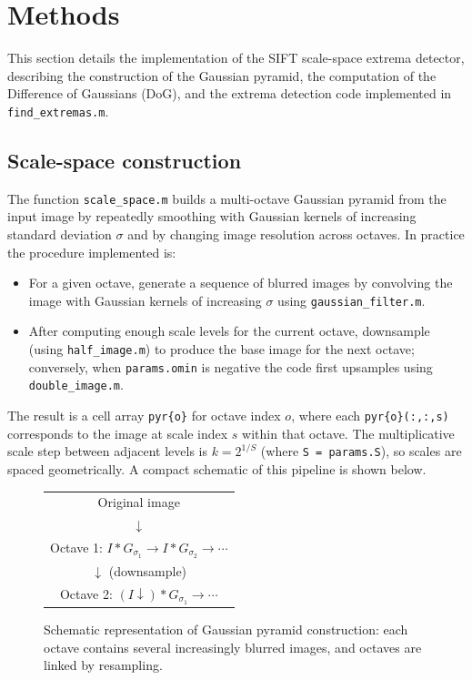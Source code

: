 \documentclass{article}
\begin{document}
\section{Methods}

This section details the implementation of the SIFT scale-space extrema detector, 
describing the construction of the Gaussian pyramid, the computation of the Difference 
of Gaussians (DoG), and the extrema detection code implemented in \texttt{find\_extremas.m}.

\subsection*{Scale-space construction}
The function \texttt{scale\_space.m} builds a multi-octave Gaussian pyramid from the input 
image by repeatedly smoothing with Gaussian kernels of increasing standard deviation $\sigma$ 
and by changing image resolution across octaves. In practice the procedure implemented is:

\begin{itemize}
    \item For a given octave, generate a sequence of blurred images by convolving the image 
    with Gaussian kernels of increasing $\sigma$ using \texttt{gaussian\_filter.m}.
    \item After computing enough scale levels for the current octave, downsample (using 
    \texttt{half\_image.m}) to produce the base image for the next octave; conversely, when 
    \texttt{params.omin} is negative the code first upsamples using \texttt{double\_image.m}.
\end{itemize}

The result is a cell array \texttt{pyr\{o\}} for octave index $o$, where each 
\texttt{pyr\{o\}(:,:,s)} corresponds to the image at scale index $s$ within that octave. 
The multiplicative scale step between adjacent levels is $k = 2^{1/S}$ (where 
\texttt{S = params.S}), so scales are spaced geometrically. A compact schematic of this 
pipeline is shown below.

\begin{figure}[h]
\centering
\begin{tabular}{c}
Original image \\[4pt]
$\downarrow$ \\[4pt]
Octave 1: $I * G_{\sigma_1} \rightarrow I * G_{\sigma_2} \rightarrow \cdots$ \\[4pt]
$\downarrow$ (downsample) \\[4pt]
Octave 2: $(I\downarrow) * G_{\sigma_1} \rightarrow \cdots$ \\
\end{tabular}
\caption{Schematic representation of Gaussian pyramid construction: each octave contains 
several increasingly blurred images, and octaves are linked by resampling.}
\end{figure}
\end{document}
